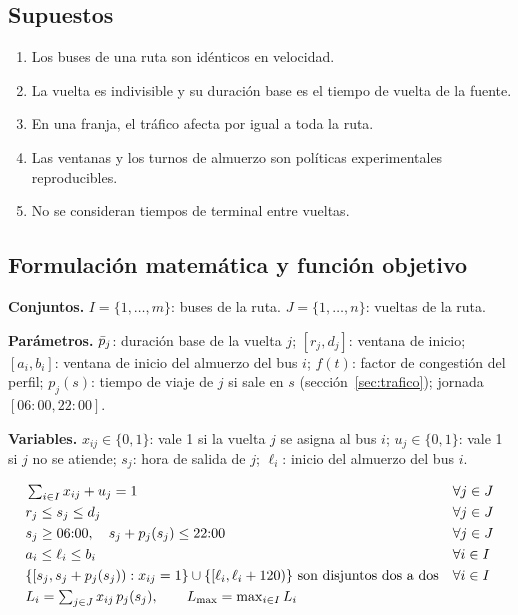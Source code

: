 \subsection{Supuestos}
\begin{enumerate}
  \item Los buses de una ruta son idénticos en velocidad.
  \item La vuelta es indivisible y su duración base es el tiempo de vuelta de la fuente.
  \item En una franja, el tráfico afecta por igual a toda la ruta.
  \item Las ventanas y los turnos de almuerzo son políticas experimentales reproducibles.
  \item No se consideran tiempos de terminal entre vueltas.
\end{enumerate}

\subsection{Formulación matemática y función objetivo}\label{sec:objetivo}
\textbf{Conjuntos.} $I = \{1, \dots, m\}$: buses de la ruta. $J = \{1, \dots, n\}$: vueltas de la ruta.

\textbf{Parámetros.} $\bar{p}_j$: duración base de la vuelta $j$; $[r_j, d_j]$: ventana de inicio; $[a_i, b_i]$: ventana de inicio del almuerzo del bus $i$; $f(t)$: factor de congestión del perfil; $p_j(s)$: tiempo de viaje de $j$ si sale en $s$ (sección~\ref{sec:trafico}); jornada $[06{:}00, 22{:}00]$.

\textbf{Variables.} $x_{ij} \in \{0,1\}$: vale 1 si la vuelta $j$ se asigna al bus $i$; $u_j \in \{0,1\}$: vale 1 si $j$ no se atiende; $s_j$: hora de salida de $j$; $\ell_i$: inicio del almuerzo del bus $i$.

\begin{align}
  & \textstyle\sum_{i \in I} x_{ij} + u_j = 1 && \forall j \in J \\
  & r_j \le s_j \le d_j && \forall j \in J \\
  & s_j \ge 06{:}00, \quad s_j + p_j(s_j) \le 22{:}00 && \forall j \in J \\
  & a_i \le \ell_i \le b_i && \forall i \in I \\
  & \{[s_j, s_j + p_j(s_j)) : x_{ij} = 1\} \cup \{[\ell_i, \ell_i + 120)\} \ \text{son disjuntos dos a dos} && \forall i \in I \\
  & L_i = \textstyle\sum_{j \in J} x_{ij}\, p_j(s_j), \qquad L_{\max} = \max_{i \in I} L_i
\end{align}

